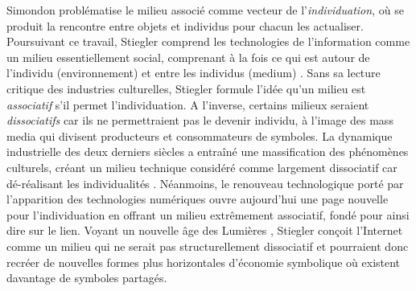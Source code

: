 Simondon problématise le milieu associé comme vecteur de l’\textit{individuation}, où se produit la rencontre entre objets et individus pour chacun les actualiser. Poursuivant ce travail, Stiegler comprend les technologies de l’information comme un milieu essentiellement social, comprenant à la fois ce qui est autour de l’individu (environnement) et entre les individus (medium) \citep{Stiegler1998a}. Sans sa lecture critique des industries culturelles, Stiegler formule l’idée qu’un milieu est \textit{associatif} s’il permet l’individuation. A l’inverse, certains milieux seraient \textit{dissociatifs} car ils ne permettraient pas le devenir individu, à l’image des mass media qui divisent producteurs et consommateurs de symboles. La dynamique industrielle des deux derniers siècles a entraîné une massification des phénomènes culturels, créant un milieu technique considéré comme largement dissociatif car dé-réalisant les individualités \citep{Simondon1989}. Néanmoins, le renouveau technologique porté par l’apparition des technologies numériques ouvre aujourd’hui une page nouvelle pour l’individuation en offrant un milieu extrêmement associatif, fondé pour ainsi dire sur le lien. Voyant un nouvelle âge des Lumières \citep{Stiegler2012}, Stiegler conçoit l’Internet comme un milieu qui ne serait pas structurellement dissociatif et pourraient donc recréer de nouvelles formes plus horizontales d’économie symbolique où existent davantage de symboles partagés. 

